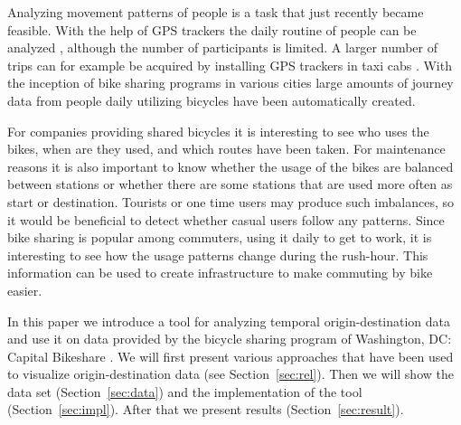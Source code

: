 Analyzing movement patterns of people is a task that just recently became
feasible. With the help of GPS trackers the daily routine of people can
be analyzed \cite{geo1, geo2, geo3}, although the number of participants
is limited. A larger number of trips can for example be acquired
by installing GPS trackers in taxi cabs \cite{Ferreira2013, Guo2012}.
With the inception of bike sharing programs in various cities large
amounts of journey data from people daily utilizing bicycles have
been automatically created.

For companies providing shared bicycles it is interesting to see who
uses the bikes, when are they used, and which routes have been taken.
For maintenance reasons it is also important to know whether the usage
of the bikes are balanced between stations or whether there are some
stations that are used more often as start or destination.
Tourists or one time users may produce such imbalances, so it
would be beneficial to detect whether casual users follow any patterns.
Since bike sharing is popular among commuters, using it daily to get
to work, it is interesting to see how the usage patterns change during
the rush-hour. This information can be used to create infrastructure
to make commuting by bike easier.

In this paper we introduce a tool for analyzing temporal
origin-destination data and use it on data provided by
the bicycle sharing program
of Washington, DC: Capital Bikeshare \cite{wash}.
We will first present various approaches that have been used
to visualize origin-destination data (see Section~\ref{sec:rel}).
Then we will show the data set (Section~\ref{sec:data}) and
the implementation of the tool (Section~\ref{sec:impl}).
After that we present results (Section~\ref{sec:result}).
